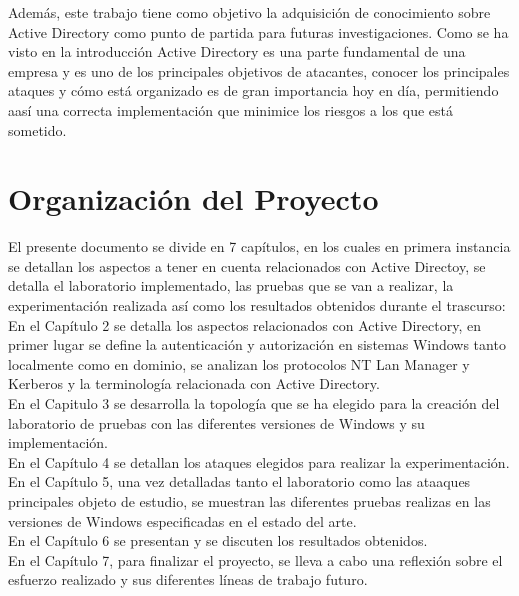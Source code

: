 Además, este trabajo tiene como objetivo la adquisición de conocimiento sobre Active Directory como punto de partida para futuras investigaciones. Como se ha visto en la introducción Active Directory es una parte fundamental de una empresa y es uno de los principales objetivos de atacantes, conocer los principales ataques y cómo está organizado es de gran importancia hoy en día, permitiendo aasí una correcta implementación que minimice los riesgos a los que está sometido.\\


\section{Organización del Proyecto}

El presente documento se divide en 7 capítulos, en los cuales en primera instancia se detallan los aspectos a tener en cuenta relacionados con Active Directoy, se detalla el laboratorio implementado, las pruebas que se van a realizar, la experimentación realizada así como los resultados obtenidos durante el trascurso:\\

En el Capítulo 2 se detalla los aspectos relacionados con Active Directory, en primer lugar se define la autenticación y autorización en sistemas Windows tanto localmente como en dominio, se analizan los protocolos NT Lan Manager y Kerberos y la terminología relacionada con Active Directory.\\

En el Capitulo 3 se desarrolla la topología que se ha elegido para la creación del laboratorio de pruebas con las diferentes versiones de Windows y su implementación.\\

En el Capítulo 4 se detallan los ataques elegidos para realizar la experimentación.\\

En el Capítulo 5, una vez detalladas tanto el laboratorio como las ataaques principales objeto de estudio, se muestran las diferentes pruebas realizas en las versiones de Windows especificadas en el estado del arte.\\

En el Capítulo 6 se presentan y se discuten los resultados obtenidos.\\

En el Capítulo 7, para finalizar el proyecto, se lleva a cabo una reflexión sobre el esfuerzo realizado y sus diferentes líneas de trabajo futuro. \\
